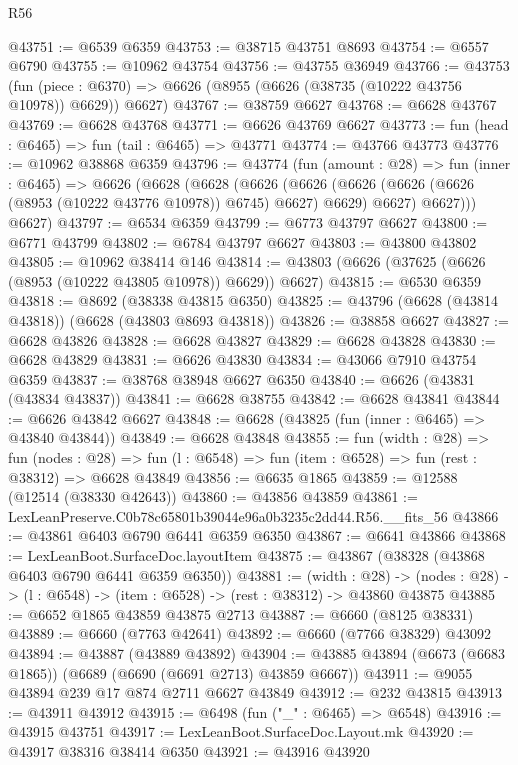 \begin{lexlean}{R56}
\begin{coremodule}
@43751 := @6539 @6359
@43753 := @38715 @43751 @8693
@43754 := @6557 @6790
@43755 := @10962 @43754
@43756 := @43755 @36949
@43766 := @43753
    (fun (piece : @6370) => @6626 (@8955 (@6626 (@38735 (@10222 @43756 @10978)) @6629)) @6627)
@43767 := @38759 @6627
@43768 := @6628 @43767
@43769 := @6628 @43768
@43771 := @6626 @43769 @6627
@43773 := fun (head : @6465) => fun (tail : @6465) => @43771
@43774 := @43766 @43773
@43776 := @10962 @38868 @6359
@43796 := @43774
    (fun (amount : @28) =>
    fun (inner : @6465) =>
    @6626
      (@6628
        (@6628
          (@6626
            (@6626 (@6626 (@6626 (@6626 (@8953 (@10222 @43776 @10978)) @6745) @6627) @6629) @6627)
            @6627)))
      @6627)
@43797 := @6534 @6359
@43799 := @6773 @43797 @6627
@43800 := @6771 @43799
@43802 := @6784 @43797 @6627
@43803 := @43800 @43802
@43805 := @10962 @38414 @146
@43814 := @43803 (@6626 (@37625 (@6626 (@8953 (@10222 @43805 @10978)) @6629)) @6627)
@43815 := @6530 @6359
@43818 := @8692 (@38338 @43815 @6350)
@43825 := @43796 (@6628 (@43814 @43818)) (@6628 (@43803 @8693 @43818))
@43826 := @38858 @6627
@43827 := @6628 @43826
@43828 := @6628 @43827
@43829 := @6628 @43828
@43830 := @6628 @43829
@43831 := @6626 @43830
@43834 := @43066 @7910 @43754 @6359
@43837 := @38768 @38948 @6627 @6350
@43840 := @6626 (@43831 (@43834 @43837))
@43841 := @6628 @38755
@43842 := @6628 @43841
@43844 := @6626 @43842 @6627
@43848 := @6628 (@43825 (fun (inner : @6465) => @43840 @43844))
@43849 := @6628 @43848
@43855 := fun (width : @28) =>
  fun (nodes : @28) => fun (l : @6548) => fun (item : @6528) => fun (rest : @38312) => @6628 @43849
@43856 := @6635 @1865
@43859 := @12588 (@12514 (@38330 @42643))
@43860 := @43856 @43859
@43861 := LexLeanPreserve.C0b78c65801b39044e96a0b3235c2dd44.R56.__fits_56
@43866 := @43861 @6403 @6790 @6441 @6359 @6350
@43867 := @6641 @43866
@43868 := LexLeanBoot.SurfaceDoc.layoutItem
@43875 := @43867 (@38328 (@43868 @6403 @6790 @6441 @6359 @6350))
@43881 := (width : @28) ->
  (nodes : @28) -> (l : @6548) -> (item : @6528) -> (rest : @38312) -> @43860 @43875
@43885 := @6652 @1865 @43859 @43875 @2713
@43887 := @6660 (@8125 @38331)
@43889 := @6660 (@7763 @42641)
@43892 := @6660 (@7766 @38329) @43092
@43894 := @43887 (@43889 @43892)
@43904 := @43885 @43894 (@6673 (@6683 @1865)) (@6689 (@6690 (@6691 @2713) @43859 @6667))
@43911 := @9055 @43894 @239 @17 @874 @2711 @6627 @43849
@43912 := @232 @43815
@43913 := @43911 @43912
@43915 := @6498 (fun ("_" : @6465) => @6548)
@43916 := @43915 @43751
@43917 := LexLeanBoot.SurfaceDoc.Layout.mk
@43920 := @43917 @38316 @38414 @6350
@43921 := @43916 @43920

\end{coremodule}
\end{lexlean}

